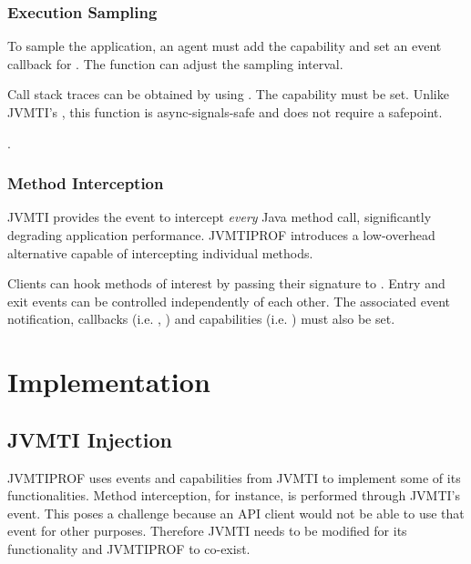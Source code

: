 \subsubsection*{Execution Sampling}

To sample the application, an agent must add the  capability and set an event callback for . The  function can adjust the sampling interval.


Call stack traces can be obtained by using . The  capability must be set. Unlike JVMTI's , this function is async-signals-safe and does not require a safepoint.

.

\subsubsection*{Method Interception}

JVMTI provides the  event to intercept \emph{every} Java method call, significantly degrading application performance. JVMTIPROF introduces a low-overhead alternative capable of intercepting individual methods.

Clients can hook methods of interest by passing their signature to . Entry and exit events can be controlled independently of each other. The associated event notification, callbacks (i.e. , ) and capabilities (i.e. ) must also be set.

\section{Implementation} \label{sec:impl}

\subsection{JVMTI Injection}

JVMTIPROF uses events and capabilities from JVMTI to implement some of its functionalities. Method interception, for instance, is performed through JVMTI's  event. This poses a challenge because an API client would not be able to use that event for other purposes. Therefore JVMTI needs to be modified for its functionality and JVMTIPROF to co-exist.

